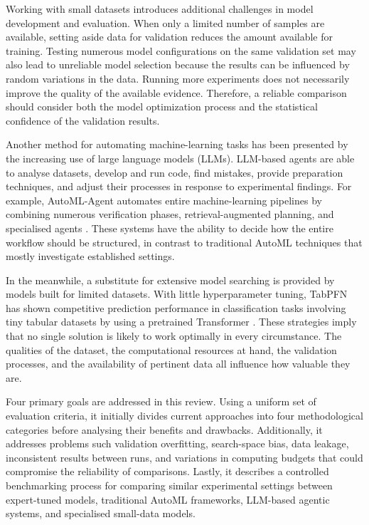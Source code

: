 \documentclass[acmsmall,screen]{acmart}
\begin{document}
Working with small datasets introduces additional challenges in model development and evaluation. When only a limited number of samples are available, setting aside data for validation reduces the amount available for training. Testing numerous model configurations on the same validation set may also lead to unreliable model selection because the results can be influenced by random variations in the data. Running more experiments does not necessarily improve the quality of the available evidence. Therefore, a reliable comparison should consider both the model optimization process and the statistical confidence of the validation results.

Another method for automating machine-learning tasks has been presented by the increasing use of large language models (LLMs). LLM-based agents are able to analyse datasets, develop and run code, find mistakes, provide preparation techniques, and adjust their processes in response to experimental findings. For example, AutoML-Agent automates entire machine-learning pipelines by combining numerous verification phases, retrieval-augmented planning, and specialised agents \cite{trirat2025}. These systems have the ability to decide how the entire workflow should be structured, in contrast to traditional AutoML techniques that mostly investigate established settings.

In the meanwhile, a substitute for extensive model searching is provided by models built for limited datasets. With little hyperparameter tuning, TabPFN has shown competitive prediction performance in classification tasks involving tiny tabular datasets by using a pretrained Transformer \cite{hollmann2023}. These strategies imply that no single solution is likely to work optimally in every circumstance. The qualities of the dataset, the computational resources at hand, the validation processes, and the availability of pertinent data all influence how valuable they are.

Four primary goals are addressed in this review. Using a uniform set of evaluation criteria, it initially divides current approaches into four methodological categories before analysing their benefits and drawbacks. Additionally, it addresses problems such validation overfitting, search-space bias, data leakage, inconsistent results between runs, and variations in computing budgets that could compromise the reliability of comparisons. Lastly, it describes a controlled benchmarking process for comparing similar experimental settings between expert-tuned models, traditional AutoML frameworks, LLM-based agentic systems, and specialised small-data models.
\end{document}
